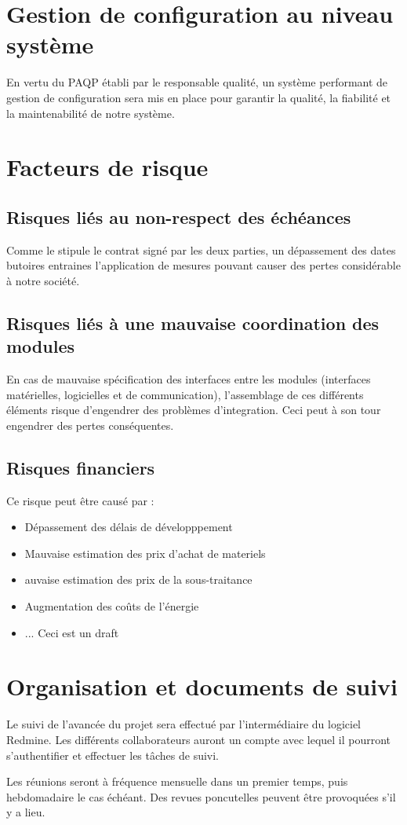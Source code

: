 \section{Gestion de configuration au niveau système}
En vertu du PAQP établi par le responsable qualité, un système performant de gestion de configuration sera mis en
place pour garantir la qualité, la fiabilité et la maintenabilité de notre système.

\section{Facteurs de risque}

\subsection{Risques liés au non-respect des échéances}
Comme le stipule le contrat signé par les deux parties, un dépassement des dates butoires entraines l'application de mesures pouvant
causer des pertes considérable à notre société.

\subsection{Risques liés à une mauvaise coordination des modules}
En cas de mauvaise spécification des interfaces entre les modules (interfaces
matérielles, logicielles et de communication), l’assemblage de ces différents éléments risque d'engendrer des problèmes d'integration.
Ceci peut à son tour engendrer des pertes conséquentes.

\subsection{Risques financiers}
Ce risque peut être causé par :
\begin{itemize}
\item Dépassement des délais de développpement
\item Mauvaise estimation des prix d'achat de materiels
\item auvaise estimation des prix de la sous-traitance
\item Augmentation des coûts de l’énergie
\item ... Ceci est un draft
\end{itemize}

\section{Organisation et documents de suivi}

Le suivi de l’avancée du projet sera effectué par l’intermédiaire du logiciel Redmine. Les différents collaborateurs auront un compte
avec lequel il pourront s'authentifier et effectuer les tâches de suivi.

Les réunions seront à fréquence mensuelle dans un premier temps, puis hebdomadaire le cas échéant. Des revues poncutelles peuvent être provoquées
s'il y a lieu.



